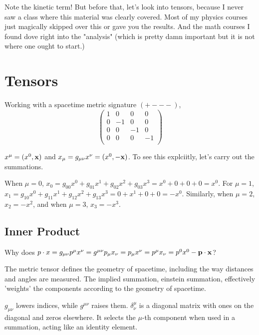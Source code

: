 Note the kinetic term!
But before that, let's look into tensors, because I never saw a class where this material was clearly covered.
Most of my physics courses just magically skipped over this or gave you the results.
And the math courses I found dove right into the "analysis" (which is pretty damn important but it is not where one
ought to start.)





\section{Tensors}

Working with a spacetime metric signature $(+ - - -)$,
$$
\begin{pmatrix}
    1 & 0  & 0  & 0  \\
    0 & -1 & 0  & 0  \\
    0 & 0  & -1 & 0  \\
    0 & 0  & 0  & -1 \\
\end{pmatrix}
$$

$x^\mu = (x^0, \boldsymbol{\mathbf{x}})$ and $x_\mu = g_{\mu\nu} x^\nu = (x^0, -\boldsymbol{\mathbf{x}})$.
To see this explciitly, let's carry out the summations.

When $\mu = 0$, $x_0 = g_{00}x^0 + g_{01}x^1 + g_{02}x^2 + g_{03}x^3 = x^0 + 0 + 0 +0 = x^0$.
For $\mu = 1$, $x_1 = g_{10}x^0 + g_{11}x^1 + g_{12}x^2 + g_{13}x^3 = 0 + x^1 + 0 +0 = -x^0$.
Similarly, when $\mu = 2$, $x_2 = -x^2$, and when $\mu =3$, $x_3 = -x^3$.


\subsection{Inner Product}

Why does $p \cdot x = g_{\mu\nu} p^\mu x^\nu = g^{\mu\nu} p_\mu x_\nu = p_\mu x^\nu = p^\mu x_\nu = p^0 x^0 - \boldsymbol{\mathbf{p}}\cdot\boldsymbol{\mathbf{x}}$?

The metric tensor defines the geometry of spacetime, including the way distances and angles are measured.
The implied summation, einstein summation, effectively 'weights' the components according to the geometry of spacetime.

$g_{\mu\nu}$ lowers indices, while $g^{\mu\nu}$ raises them.
$\delta^{\mu}_{\nu}$ is a diagonal matrix with ones on the diagonal and zeros elsewhere.
It selects the $\mu$-th component when used in a summation, acting like an identity element.

